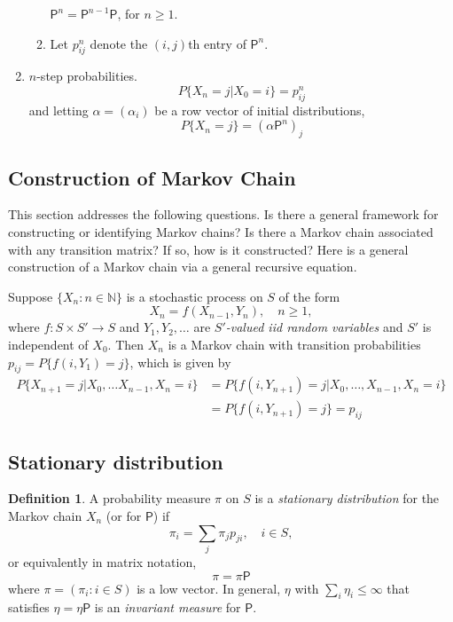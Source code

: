 \documentclass[twoside]{article}
\theoremstyle{definition}
\newtheorem{definition}{Definition}[section]
\theoremstyle{remark}
\theoremstyle{remark}
\begin{document}
\begin{enumerate}
\begin{enumerate}
    $\mathsf{P}^n = \mathsf{P}^{n-1} \mathsf{P}$, for $n \geq 1$.
    \item Let $p_{ij}^n$ denote the $(i, j)$th entry of $\mathsf{P}^n$.
  \end{enumerate}
  \item $n$-step probabilities.
  \begin{equation}
    P{\{ X_n = j | X_0 = i \}} = p_{ij}^n
  \end{equation}
  and letting $\alpha = (\alpha_i)$ be a row vector of initial distributions,
  \begin{equation}
    P{\{ X_n = j \}} = (\alpha\mathsf{P}^n)_j
  \end{equation}
\end{enumerate}

\subsection{Construction of Markov Chain}
This section addresses the following questions. Is there a general framework for
constructing or identifying Markov chains? Is there a Markov chain associated
with any transition matrix? If so, how is it constructed? Here is a general
construction of a Markov chain via a general recursive equation.


Suppose ${\{ X_n : n \in \mathbb{N} \}}$ is a stochastic process on $S$ of the
form
\begin{equation}
  X_n = f(X_{n-1}, Y_n), \quad n \geq 1,
\end{equation}
where $f: S \times S' \rightarrow S$ and $Y_1,Y_2,\ldots$ are
\textit{$S'$-valued iid random variables} and $S'$ is independent of $X_0$.
Then $X_n$ is a Markov chain with transition probabilities
$p_{ij} = P{\{ f(i, Y_1) = j \}}$, which is given by
\begin{equation}
  \begin{split}
    P{\{ X_{n+1} = j | X_0, \ldots X_{n-1}, X_n = i \}}
    &= P{\{ f(i, Y_{n+1}) = j | X_0, \ldots, X_{n-1}, X_n = i \}} \\
    &= P{\{ f(i, Y_{n+1}) = j \}} = p_{ij}
  \end{split}
\end{equation}

\subsection{Stationary distribution}
\begin{definition}
  A probability measure $\pi$ on $S$ is a \textit{stationary distribution} for
  the Markov chain $X_n$ (or for $\mathsf{P}$) if
  \begin{equation}
    \pi_i = \sum_{j} \pi_j p_{ji}, \quad i \in S,
  \end{equation}
  or equivalently in matrix notation,
  \begin{equation}
    \pi = \pi \mathsf{P}
  \end{equation}
  where $\pi = (\pi_i : i \in S)$ is a low vector. In general, $\eta$ with
  $\sum_{i}\eta_i \leq \infty$ that satisfies $\eta = \eta \mathsf{P}$ is
  an \textit{invariant measure} for $\mathsf{P}$.
\end{definition}
\end{document}

